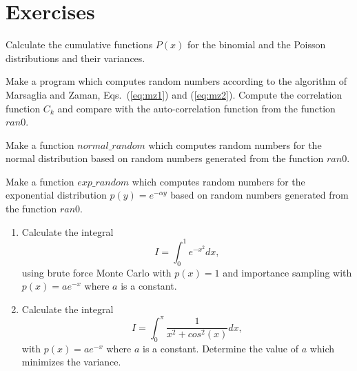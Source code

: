 \section{Exercises}
\begin{prob}
Calculate the cumulative functions $P(x)$ for the binomial and the Poisson distributions and their variances.
\end{prob}
\begin{prob}
Make a program which computes random numbers according to the algorithm of
Marsaglia and Zaman, Eqs.~(\ref{eq:mz1}) and (\ref{eq:mz2}). Compute the 
correlation function $C_k$ and compare with the auto-correlation function
from the function $ran0$.
\end{prob}
\begin{prob}
Make a function $normal\_random$ which computes random numbers 
for the normal distribution 
based on random numbers generated 
from the function $ran0$.
\end{prob}
\begin{prob}
Make a function $exp\_random$ which computes random numbers 
for the exponential distribution  $p(y)=e^{-\alpha y}$
based on random numbers generated 
from the function $ran0$.
\end{prob}
\begin{prob}
\begin{enumerate}
\item Calculate the integral
\[
   I=\int_0^1e^{-x^2}dx,
\]
using brute force Monte Carlo with $p(x)=1$ and importance sampling
with $p(x)=ae^{-x}$ where $a$ is a constant.
\item
Calculate the integral
\[
   I=\int_0^{\pi}\frac{1}{x^2+cos^2(x)}dx,
\]
with $p(x)=ae^{-x}$ where $a$ is a constant. Determine the value of 
$a$ which minimizes the variance.
\end{enumerate}
\end{prob}

